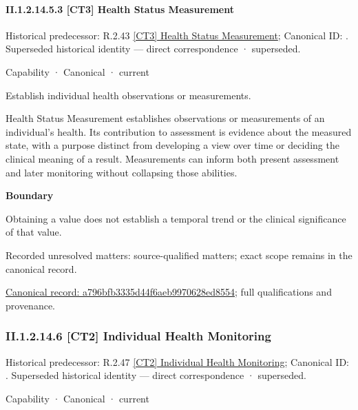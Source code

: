 \paragraph*{II.1.2.14.5.3 [CT3] Health Status Measurement}
\label{navigation:II.1.2.14.5.3}

{\small Historical predecessor: R.2.43 \hyperref[element:3717906f7f8840d3a8a3e3877543dd18]{[CT3] Health Status Measurement}; Canonical ID: \texttt{}. Superseded historical identity — direct correspondence · superseded.}\par
\label{element:a796bfb3335d44f6aeb9970628ed8554}
{\small Capability · Canonical · current}\par

Establish individual health observations or measurements.



Health Status Measurement establishes observations or measurements of an individual's health. Its contribution to assessment is evidence about the measured state, with a purpose distinct from developing a view over time or deciding the clinical meaning of a result. Measurements can inform both present assessment and later monitoring without collapsing those abilities.



\textbf{Boundary}



Obtaining a value does not establish a temporal trend or the clinical significance of that value.


{\small Recorded unresolved matters: source-qualified matters; exact scope remains in the canonical record.}\par
{\footnotesize \href{../../../../continuum/strategy/capability/a796bfb3335d44f6aeb9970628ed8554.md}{Canonical record: a796bfb3335d44f6aeb9970628ed8554}; full qualifications and provenance.}\par
\subsubsection*{II.1.2.14.6 [CT2] Individual Health Monitoring}
\label{navigation:II.1.2.14.6}

{\small Historical predecessor: R.2.47 \hyperref[element:31e7c27556314cafb74d040441d2dac6]{[CT2] Individual Health Monitoring}; Canonical ID: \texttt{}. Superseded historical identity — direct correspondence · superseded.}\par
\label{element:c7d0e498e1ad44138df940af2f91cd2d}
{\small Capability · Canonical · current}\par

